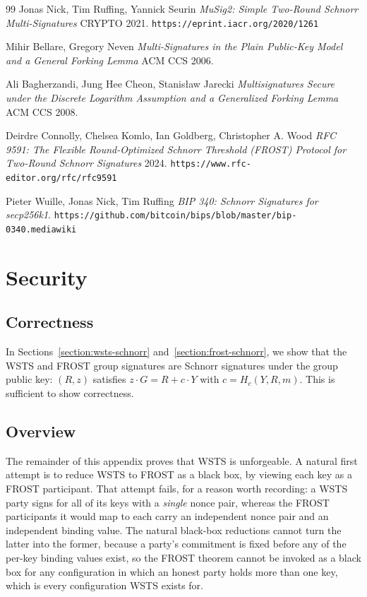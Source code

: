 \documentclass{article}
\theoremstyle{plain}
\theoremstyle{definition}
\theoremstyle{remark}
\begin{document}
\begin{thebibliography}{99}
  Jonas Nick, Tim Ruffing, Yannick Seurin
  \emph{MuSig2: Simple Two-Round Schnorr Multi-Signatures} CRYPTO 2021.
  \texttt{https://eprint.iacr.org/2020/1261}

  Mihir Bellare, Gregory Neven
  \emph{Multi-Signatures in the Plain Public-Key Model and a General Forking Lemma} ACM CCS 2006.

  Ali Bagherzandi, Jung Hee Cheon, Stanis\l{}aw Jarecki
  \emph{Multisignatures Secure under the Discrete Logarithm Assumption and a Generalized Forking Lemma} ACM CCS 2008.

  Deirdre Connolly, Chelsea Komlo, Ian Goldberg, Christopher A. Wood
  \emph{RFC 9591: The Flexible Round-Optimized Schnorr Threshold (FROST) Protocol for Two-Round Schnorr Signatures} 2024.
  \texttt{https://www.rfc-editor.org/rfc/rfc9591}

  Pieter Wuille, Jonas Nick, Tim Ruffing
  \emph{BIP 340: Schnorr Signatures for secp256k1}.
  \texttt{https://github.com/bitcoin/bips/blob/master/bip-0340.mediawiki}

\end{thebibliography}

\appendix
\newpage
\onecolumn

\section{
  Security
}\label{section:security}

\subsection{
  Correctness
}

In Sections~\ref{section:wsts-schnorr} and~\ref{section:frost-schnorr}, we show that the WSTS and FROST group signatures are Schnorr signatures under the group public key: $(R, z)$ satisfies $z \cdot G = R + c \cdot Y$ with $c = H_c(Y, R, m)$.  This is sufficient to show correctness.

\subsection{
  Overview
}

The remainder of this appendix proves that WSTS is unforgeable.  A natural first attempt is to reduce WSTS to FROST as a black box, by viewing each key as a FROST participant.  That attempt fails, for a reason worth recording: a WSTS party signs for all of its keys with a \emph{single} nonce pair, whereas the FROST participants it would map to each carry an independent nonce pair and an independent binding value.  The natural black-box reductions cannot turn the latter into the former, because a party's commitment is fixed before any of the per-key binding values exist, so the FROST theorem cannot be invoked as a black box for any configuration in which an honest party holds more than one key, which is every configuration WSTS exists for.
\end{document}
